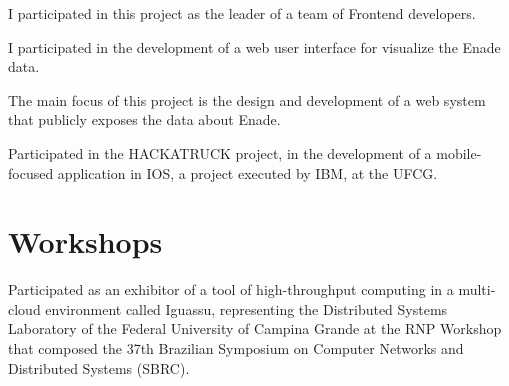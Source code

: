 \documentclass[]{deedy-resume-openfont}
\begin{document}
\begin{minipage}[t]{0.66\textwidth}

\vspace{\topsep} %
\begin{tightemize}
\item I participated in this project as the leader of a team of Frontend developers.
\item I participated in the development of a web user interface for visualize the Enade data. 
\item The main focus of this project is the design and development of a web system that publicly exposes the data about Enade.
\end{tightemize}
\sectionsep


\vspace{\topsep} %
\begin{tightemize}
\item Participated in the HACKATRUCK project, in the development of a
mobile-focused application in IOS, a project executed by IBM, at the UFCG.
\end{tightemize}
\sectionsep
\sectionsep

\section{Workshops}

\vspace{\topsep} %
\begin{tightemize}
\item Participated as an exhibitor of a tool of high-throughput computing in a multi-cloud environment called Iguassu, representing the Distributed Systems Laboratory of the Federal University of Campina Grande at the RNP Workshop that composed the 37th Brazilian Symposium on Computer Networks and Distributed Systems (SBRC).
\end{tightemize}
\sectionsep

\sectionsep
\end{minipage} 
\end{document}
